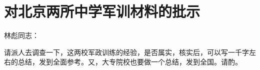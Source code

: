 \section[对北京两所中学军训材料的批示（一九六七年二月）]{对北京两所中学军训材料的批示}


林彪同志：

请派人去调查一下，这两校军政训练的经验，是否属实，核实后，可以写一千字左右的总结，发到全面参考。又，大专院校也要做一个总结，发到全国。请酌。



